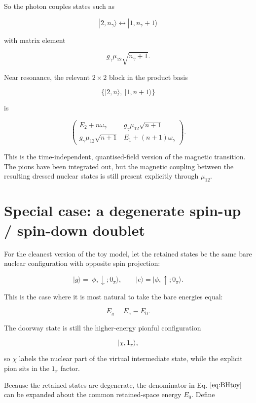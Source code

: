 \documentclass[
]{article}
\renewcommand{\[}{\begin{equation}}
\renewcommand{\]}{\end{equation}}
\begin{document}
So the photon couples states such as

\[
|2,n_\gamma\rangle
\leftrightarrow
|1,n_\gamma+1\rangle
\]

with matrix element

\[
g_\gamma \mu_{12}\sqrt{n_\gamma+1}.
\label{eq:matrixElementPhoton}
\]

Near resonance, the relevant \(2\times 2\) block in the product basis

\[
\{|2,n\rangle,\ |1,n+1\rangle\}
\]

is

\[
\begin{pmatrix}
E_2 + n\omega_\gamma
&
g_\gamma \mu_{12}\sqrt{n+1}
\\
g_\gamma \mu_{12}\sqrt{n+1}
&
E_1 + (n+1)\omega_\gamma
\end{pmatrix}.
\label{eq:photonBlock}
\]

This is the time-independent, quantised-field version of the magnetic
transition. The pions have been integrated out, but the magnetic
coupling between the resulting dressed nuclear states is still present
explicitly through \(\mu_{12}\).

\section{Special case: a degenerate spin-up / spin-down
doublet}\label{special-case-a-degenerate-spin-up-spin-down-doublet}

For the cleanest version of the toy model, let the retained states be
the same bare nuclear configuration with opposite spin projection:

\[
|g\rangle = |\phi,\downarrow;0_\pi\rangle,
\qquad
|e\rangle = |\phi,\uparrow;0_\pi\rangle.
\label{eq:spinflipstates}
\]

This is the case where it is most natural to take the bare energies
equal:

\[
E_g = E_e \equiv E_0.
\label{eq:spinflipdeg}
\]

The doorway state is still the higher-energy pionful configuration

\[
|\chi,1_\pi\rangle,
\label{eq:spinflipdoorway}
\]

so \(\chi\) labels the nuclear part of the virtual intermediate state,
while the explicit pion sits in the \(1_\pi\) factor.

Because the retained states are degenerate, the denominator in Eq.
\(\ref{eq:BHtoy}\) can be expanded about the common retained-space
energy \(E_0\). Define
\end{document}

